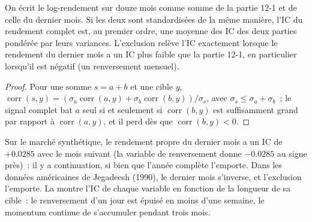 \begin{proposition}\label{prop:rs:price-and-volume-features:skip}
On écrit le log-rendement sur douze mois comme somme de la partie 12-1 et de celle du dernier mois. Si les deux sont standardisées de la même manière, l'IC
du rendement complet est, au premier ordre, une moyenne des IC des deux parties pondérée par leurs variances. L'exclusion relève l'IC exactement lorsque le
rendement du dernier mois a un IC plus faible que la partie 12-1, en particulier lorsqu'il est négatif (un renversement mensuel).
\end{proposition}

\begin{proof}
Pour une somme $s = a + b$ et une cible $y$, $\operatorname{corr}(s, y) = (\sigma_a\operatorname{corr}(a, y) + \sigma_b\operatorname{corr}(b,
y))/\sigma_s$, avec $\sigma_s \le \sigma_a + \sigma_b$~; le signal complet bat $a$ seul si et seulement si $\operatorname{corr}(b, y)$ est
suffisamment grand par rapport à $\operatorname{corr}(a, y)$, et il perd dès que $\operatorname{corr}(b, y) < 0$.
\end{proof}

Sur le marché synthétique, le rendement propre du dernier mois a un IC de $+0.0285$ avec le mois suivant (la variable de renversement
donne $-0.0285$ au signe près)~: il y a continuation, si bien que l'année complète l'emporte. Dans les données américaines de Jegadeesh (1990), le dernier mois s'inverse, et l'exclusion l'emporte.
La  montre l'IC de chaque variable en fonction de la longueur de sa cible~: le renversement d'un jour est
épuisé en moins d'une semaine, le momentum continue de s'accumuler pendant trois mois.

